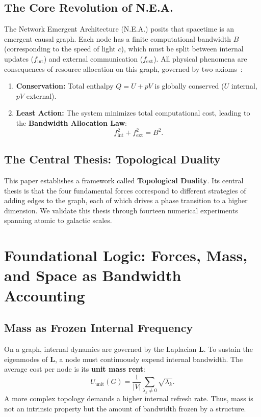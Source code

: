 \documentclass[12pt,a4paper]{article}
\begin{document}
\subsection{The Core Revolution of N.E.A.}
The Network Emergent Architecture (N.E.A.) posits that spacetime is an emergent causal graph. Each node has a finite computational bandwidth $B$ (corresponding to the speed of light $c$), which must be split between internal updates ($f_{\text{int}}$) and external communication ($f_{\text{ext}}$). All physical phenomena are consequences of resource allocation on this graph, governed by two axioms~\cite{nea123}:
\begin{enumerate}
    \item \textbf{Conservation:} Total enthalpy $Q = U + pV$ is globally conserved ($U$ internal, $pV$ external).
    \item \textbf{Least Action:} The system minimizes total computational cost, leading to the \textbf{Bandwidth Allocation Law}:
    \begin{equation}
        f_{\text{int}}^2 + f_{\text{ext}}^2 = B^2.
    \end{equation}
\end{enumerate}

\subsection{The Central Thesis: Topological Duality}
This paper establishes a framework called \textbf{Topological Duality}. Its central thesis is that the four fundamental forces correspond to different strategies of adding edges to the graph, each of which drives a phase transition to a higher dimension. We validate this thesis through fourteen numerical experiments spanning atomic to galactic scales.

\section{Foundational Logic: Forces, Mass, and Space as Bandwidth Accounting}

\subsection{Mass as Frozen Internal Frequency}
On a graph, internal dynamics are governed by the Laplacian $\mathbf{L}$. To sustain the eigenmodes of $\mathbf{L}$, a node must continuously expend internal bandwidth. The average cost per node is its \textbf{unit mass rent}:
\begin{equation}
    U_{\text{unit}}(G) = \frac{1}{|V|} \sum_{\lambda_k \neq 0} \sqrt{\lambda_k}.
\end{equation}
A more complex topology demands a higher internal refresh rate. Thus, mass is not an intrinsic property but the amount of bandwidth frozen by a structure.
\end{document}
